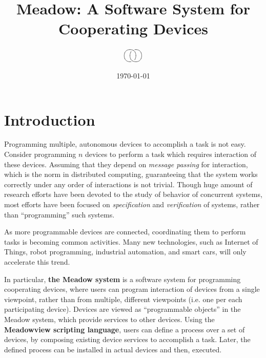 \documentclass{note}
\begin{document}
\small


\title{\large\bf{}\textcolor{blue2}{Meadow:  A Software System for Cooperating
    Devices}}
\author{
$$\xy
\xygraph{!{0;/r0.7pc/:} !{\vover}[u]
  !{\hcap[-2]} [d] !{\vover-} [ruu] !{\hcap[2]}}
\endxy$$
}
\date{\normalsize\today}
\maketitle


\tableofcontents

\section{Introduction}
Programming multiple, autonomous devices to accomplish a task
is not easy. Consider programming $n$ devices to 
perform a task which requires interaction of these devices.
Assuming that they depend on {\em message passing\/} for interaction,
which is the norm in distributed computing, 
guaranteeing that the system works correctly under any order of
interactions is not trivial. Though huge amount of research efforts
have been devoted to the study of behavior of concurrent systems, 
most efforts have been focused on
{\em specification\/} and {\em verification\/} of systems, rather than 
``programming'' such systems.%

As more programmable devices are connected, coordinating them
to perform tasks is becoming common activities. Many new 
technologies, such as Internet of Things, robot programming, industrial
automation, and smart cars, will only accelerate this trend.

In particular, \textcolor{blue2}{\textbf{the Meadow system}} is a software
system for programming cooperating devices, where users can program
interaction of devices from a single viewpoint, rather than from multiple,
different viewpoints (i.e. one per each participating device).
Devices are viewed as ``programmable objects'' in the Meadow system, 
which provide \textcolor{blue2}{services} to other devices.
Using the \textcolor{blue2}{\textbf{Meadowview scripting language}}, users 
can define a process over a set of devices, by composing existing device
services to accomplish a task.  
Later, the defined process can be installed in actual devices and then,
executed. 
 
\end{document}
